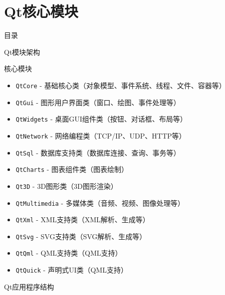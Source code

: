 \documentclass[UTF8,aspectratio=169]{beamer}
\begin{document}
\section{Qt核心模块}
\begin{frame}{目录}
    \begin{multicols}{2}
        \tableofcontents[currentsection]
    \end{multicols}
\end{frame}

\begin{frame}{Qt模块架构}
    \begin{ytublock}{核心模块}
        \begin{itemize}
            \item \texttt{QtCore} - 基础核心类（对象模型、事件系统、线程、文件、容器等）
            \item \texttt{QtGui} - 图形用户界面类（窗口、绘图、事件处理等）
            \item \texttt{QtWidgets} - 桌面GUI组件类（按钮、对话框、布局等）
            \item \texttt{QtNetwork} - 网络编程类（TCP/IP、UDP、HTTP等）
            \item \texttt{QtSql} - 数据库支持类（数据库连接、查询、事务等）
            \item \texttt{QtCharts} - 图表组件类（图表绘制）
            \item \texttt{Qt3D} - 3D图形类（3D图形渲染）
            \item \texttt{QtMultimedia} - 多媒体类（音频、视频、图像处理等）
            \item \texttt{QtXml} - XML支持类（XML解析、生成等）
            \item \texttt{QtSvg} - SVG支持类（SVG解析、生成等）
            \item \texttt{QtQml} - QML支持类（QML支持）
            \item \texttt{QtQuick} - 声明式UI类（QML支持）
        \end{itemize}
    \end{ytublock}
\end{frame}

\begin{frame}[fragile]{Qt应用程序结构}
    \begin{columns}
        \begin{column}{0.48\textwidth}
            \inputminted[firstline=1,lastline=20]{cpp}{code/qt_example.cpp}
        \end{column}
        \begin{column}{0.48\textwidth}
            \inputminted[firstline=20,lastline=40]{cpp}{code/qt_example.cpp}
        \end{column}
    \end{columns}
\end{frame}
\end{document}
